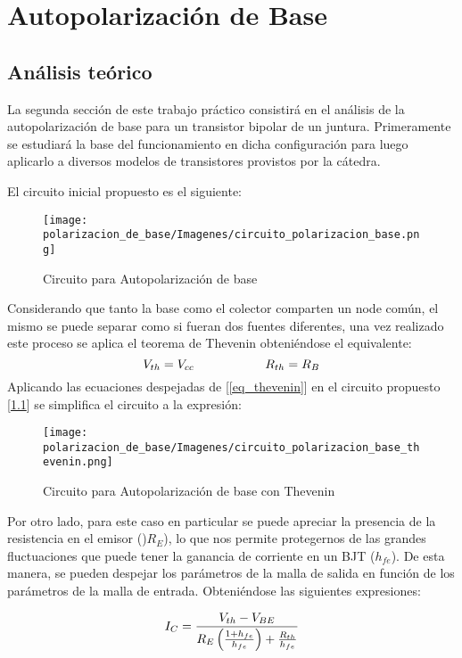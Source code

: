 \chapter{Autopolarización de Base}
\section{Análisis teórico}
La segunda sección de este trabajo práctico consistirá en el análisis de la autopolarización de 
base para un transistor bipolar de un juntura. Primeramente se estudiará la base del funcionamiento
en dicha configuración para luego aplicarlo a diversos modelos de transistores provistos 
por la cátedra. \par 
El circuito inicial propuesto es el siguiente:

\begin{figure}[H]
    \centering
    \begin{center}
        \texttt{[image: polarizacion\_de\_base/Imagenes/circuito\_polarizacion\_base.png]}
        \label{circuito_ejercicio_2}
    \end{center}
    \vspace{-8mm}
    \caption{Circuito para Autopolarización de base}
\end{figure}
Considerando que tanto la base como el colector comparten un node común, el mismo se puede 
separar como si fueran dos fuentes diferentes, una vez realizado este proceso se aplica 
el teorema de Thevenin obteniéndose el equivalente:
\begin{equation}
    V_{th}= V_{cc} \hspace{20mm} R_{th}=R_B 
    \label{eq_thevenin} 
\end{equation}
Aplicando las ecuaciones despejadas de [\ref{eq_thevenin}] en el circuito propuesto [\ref{circuito_ejercicio_2}]
se simplifica el circuito a la expresión:

\begin{figure}[H]
    \centering
    \begin{center}
        \texttt{[image: polarizacion\_de\_base/Imagenes/circuito\_polarizacion\_base\_thevenin.png]}
        \label{circuito_ejercicio_2_thevenin}
    \end{center}
    \caption{Circuito para Autopolarización de base con Thevenin}
\end{figure}
Por otro lado, para este caso en particular se puede apreciar la presencia de la 
resistencia en el emisor ()$R_E$), lo que nos permite protegernos de las grandes fluctuaciones 
que puede tener la ganancia de corriente en un BJT ($h_{fe}$). De esta manera, se pueden 
despejar los parámetros de la malla de salida en función de los parámetros de la malla 
de entrada. Obteniéndose las siguientes expresiones: \par 
\begin{equation}
    \vspace{8mm}
    I_C=\frac{V_{th}-V_{BE}}{R_E\left(\frac{1+h_{fe}}{h_{fe}}\right)+\frac{R_{th}}{h_{fe}}}
    \label{eq_I_c}
\end{equation}

